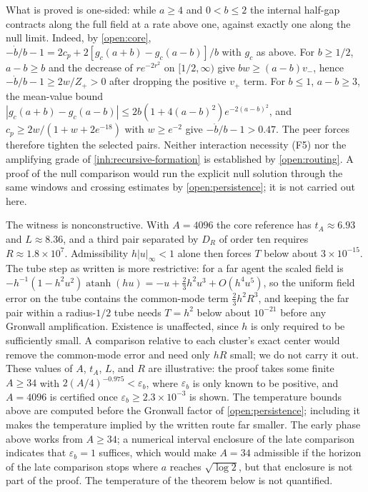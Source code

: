 What is proved is one-sided: while $a\ge4$ and $0<b\le2$ the internal half-gap contracts along the full field at a rate above one, against exactly one along the null limit. Indeed, by \cref{open:core}, $-\dot b/b-1=2c_p+2[g_c(a+b)-g_c(a-b)]/b$ with $g_c$ as above. For $b\ge1/2$, $a-b\ge b$ and the decrease of $re^{-2r^2}$ on $[1/2,\infty)$ give $bw\ge(a-b)v_-$, hence $-\dot b/b-1\ge2w/Z_+>0$ after dropping the positive $v_+$ term. For $b\le1$, $a-b\ge3$, the mean-value bound $|g_c(a+b)-g_c(a-b)|\le2b(1+4(a-b)^2)e^{-2(a-b)^2}$, and $c_p\ge2w/(1+w+2e^{-18})$ with $w\ge e^{-2}$ give $-\dot b/b-1>0.47$. The peer forces therefore tighten the selected pairs. Neither interaction necessity (F5) nor the amplifying grade of \cref{inh:recursive-formation} is established by \cref{open:routing}. A proof of the null comparison would run the explicit null solution through the same windows and crossing estimates by \cref{open:persistence}; it is not carried out here.

The witness is nonconstructive. With $A=4096$ the core reference has $t_A\approx6.93$ and $L\approx8.36$, and a third pair separated by $D_R$ of order ten requires $R\approx1.8\times10^7$. Admissibility $h|u|_\infty<1$ alone then forces $T$ below about $3\times10^{-15}$. The tube step as written is more restrictive: for a far agent the scaled field is $-h^{-1}(1-h^2u^2)\operatorname{atanh}(hu)=-u+\tfrac23h^2u^3+O(h^4u^5)$, so the uniform field error on the tube contains the common-mode term $\tfrac23h^2R^3$, and keeping the far pair within a radius-$1/2$ tube needs $T=h^2$ below about $10^{-21}$ before any Gronwall amplification. Existence is unaffected, since $h$ is only required to be sufficiently small. A comparison relative to each cluster's exact center would remove the common-mode error and need only $hR$ small; we do not carry it out. These values of $A$, $t_A$, $L$, and $R$ are illustrative: the proof takes some finite $A\ge34$ with $2(A/4)^{-0.975}<\varepsilon_b$, where $\varepsilon_b$ is only known to be positive, and $A=4096$ is certified once $\varepsilon_b\ge2.3\times10^{-3}$ is shown. The temperature bounds above are computed before the Gronwall factor of \cref{open:persistence}; including it makes the temperature implied by the written route far smaller. The early phase above works from $A\ge34$; a numerical interval enclosure of the late comparison indicates that $\varepsilon_b=1$ suffices, which would make $A=34$ admissible if the horizon of the late comparison stops where $a$ reaches $\sqrt{\log2}$, but that enclosure is not part of the proof. The temperature of the theorem below is not quantified.

